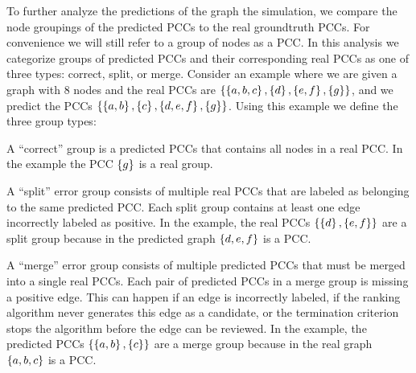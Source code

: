     To further analyze the predictions of the graph the simulation, we compare the node groupings of the
      predicted PCCs to the real groundtruth PCCs.
    For convenience we will still refer to a group of nodes as a PCC.
    In this analysis we categorize groups of predicted PCCs and their corresponding real PCCs as one of three
      types:
    correct, split, or merge.
    Consider an example where we are given a graph with $8$ nodes and the real PCCs are %
    $\left\{\left\{a, b, c\right\}, \left\{d\right\}, \left\{e, f\right\}, \left\{g\right\}\right\}$, and we predict the PCCs%
    $\left\{\left\{a, b\right\}, \left\{c\right\}, \left\{d, e, f\right\}, \left\{g\right\}\right\}$.
    Using this example we define the three group types:
    \begin{enumln}
        \item A ``correct'' group is a predicted PCCs that contains all nodes in a real PCC.
        In the example the PCC $\left\{g\right\}$ is a real group.
        
        \item A ``split'' error group consists of multiple real PCCs that are labeled as belonging to the same
          predicted PCC.
        Each split group contains at least one edge incorrectly labeled as positive.
        In the example, the real PCCs $\left\{\left\{d\right\}, \left\{e, f\right\}\right\}$ are a split group because in the
          predicted graph $\left\{d, e, f\right\}$ is a PCC.
      
        \item A ``merge'' error group consists of multiple predicted PCCs that must be merged into a single real
          PCCs.
        Each pair of predicted PCCs in a merge group is missing a positive edge.
        This can happen if an edge is incorrectly labeled, if the ranking algorithm never generates this edge as
          a candidate, or the termination criterion stops the algorithm before the edge can be reviewed.
        In the example, the predicted PCCs $\left\{\left\{a, b\right\}, \left\{c\right\}\right\}$ are a merge group because in the
          real graph $\left\{a, b, c\right\}$ is a PCC.
        
    \end{enumln}
